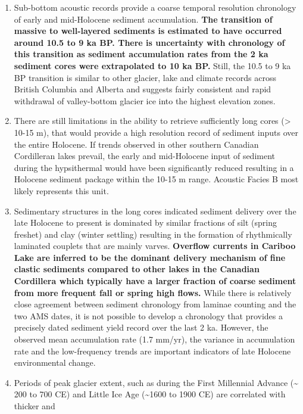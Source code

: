 \documentclass[Royal,times,doublespace,sageh]{sagej}
\providecommand{\tightlist}{%
  \setlength{\itemsep}{0pt}\setlength{\parskip}{0pt}}
\begin{document}
\begin{enumerate}
\def\labelenumi{\arabic{enumi}.}
\tightlist
\item
  Sub-bottom acoustic records provide a coarse temporal resolution
  chronology of early and mid-Holocene sediment accumulation.
  \textbf{The transition of massive to well-layered sediments is
  estimated to have occurred around 10.5 to 9 ka BP. There is
  uncertainty with chronology of this transition as sediment
  accumulation rates from the 2 ka sediment cores were extrapolated to
  10 ka BP.} Still, the 10.5 to 9 ka BP transition is similar to other
  glacier, lake and climate records across British Columbia and Alberta
  and suggests fairly consistent and rapid withdrawal of valley-bottom
  glacier ice into the highest elevation zones.
\item
  There are still limitations in the ability to retrieve sufficiently
  long cores (\textgreater{} 10-15 m), that would provide a high
  resolution record of sediment inputs over the entire Holocene. If
  trends observed in other southern Canadian Cordilleran lakes prevail,
  the early and mid-Holocene input of sediment during the hypsithermal
  would have been significantly reduced resulting in a Holocene sediment
  package within the 10-15 m range. Acoustic Facies B most likely
  represents this unit.
\item
  Sedimentary structures in the long cores indicated sediment delivery
  over the late Holocene to present is dominated by similar fractions of
  silt (spring freshet) and clay (winter settling) resulting in the
  formation of rhythmically laminated couplets that are mainly varves.
  \textbf{Overflow currents in Cariboo Lake are inferred to be the
  dominant delivery mechanism of fine clastic sediments compared to
  other lakes in the Canadian Cordillera which typically have a larger
  fraction of coarse sediment from more frequent fall or spring high
  flows.} While there is relatively close agreement between sediment
  chronology from laminae counting and the two AMS dates, it is not
  possible to develop a chronology that provides a precisely dated
  sediment yield record over the last 2 ka. However, the observed mean
  accumulation rate (1.7 mm/yr), the variance in accumulation rate and
  the low-frequency trends are important indicators of late Holocene
  environmental change.
\item
  Periods of peak glacier extent, such as during the First Millennial
  Advance (\textasciitilde{} 200 to 700 CE) and Little Ice Age
  (\textasciitilde1600 to 1900 CE) are correlated with thicker and

\end{enumerate}
\end{document}
